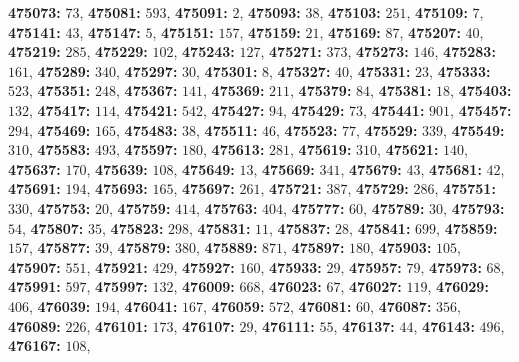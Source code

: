 \textsf{\bfseries 475073:} $73$, \textsf{\bfseries 475081:} $593$, \textsf{\bfseries 475091:} $2$, \textsf{\bfseries 475093:} $38$, \textsf{\bfseries 475103:} $251$, \textsf{\bfseries 475109:} $7$, \textsf{\bfseries 475141:} $43$, \textsf{\bfseries 475147:} $5$, \textsf{\bfseries 475151:} $157$, \textsf{\bfseries 475159:} $21$, \textsf{\bfseries 475169:} $87$, \textsf{\bfseries 475207:} $40$, \textsf{\bfseries 475219:} $285$, \textsf{\bfseries 475229:} $102$, \textsf{\bfseries 475243:} $127$, \textsf{\bfseries 475271:} $373$, \textsf{\bfseries 475273:} $146$, \textsf{\bfseries 475283:} $161$, \textsf{\bfseries 475289:} $340$, \textsf{\bfseries 475297:} $30$, \textsf{\bfseries 475301:} $8$, \textsf{\bfseries 475327:} $40$, \textsf{\bfseries 475331:} $23$, \textsf{\bfseries 475333:} $523$, \textsf{\bfseries 475351:} $248$, \textsf{\bfseries 475367:} $141$, \textsf{\bfseries 475369:} $211$, \textsf{\bfseries 475379:} $84$, \textsf{\bfseries 475381:} $18$, \textsf{\bfseries 475403:} $132$, \textsf{\bfseries 475417:} $114$, \textsf{\bfseries 475421:} $542$, \textsf{\bfseries 475427:} $94$, \textsf{\bfseries 475429:} $73$, \textsf{\bfseries 475441:} $901$, \textsf{\bfseries 475457:} $294$, \textsf{\bfseries 475469:} $165$, \textsf{\bfseries 475483:} $38$, \textsf{\bfseries 475511:} $46$, \textsf{\bfseries 475523:} $77$, \textsf{\bfseries 475529:} $339$, \textsf{\bfseries 475549:} $310$, \textsf{\bfseries 475583:} $493$, \textsf{\bfseries 475597:} $180$, \textsf{\bfseries 475613:} $281$, \textsf{\bfseries 475619:} $310$, \textsf{\bfseries 475621:} $140$, \textsf{\bfseries 475637:} $170$, \textsf{\bfseries 475639:} $108$, \textsf{\bfseries 475649:} $13$, \textsf{\bfseries 475669:} $341$, \textsf{\bfseries 475679:} $43$, \textsf{\bfseries 475681:} $42$, \textsf{\bfseries 475691:} $194$, \textsf{\bfseries 475693:} $165$, \textsf{\bfseries 475697:} $261$, \textsf{\bfseries 475721:} $387$, \textsf{\bfseries 475729:} $286$, \textsf{\bfseries 475751:} $330$, \textsf{\bfseries 475753:} $20$, \textsf{\bfseries 475759:} $414$, \textsf{\bfseries 475763:} $404$, \textsf{\bfseries 475777:} $60$, \textsf{\bfseries 475789:} $30$, \textsf{\bfseries 475793:} $54$, \textsf{\bfseries 475807:} $35$, \textsf{\bfseries 475823:} $298$, \textsf{\bfseries 475831:} $11$, \textsf{\bfseries 475837:} $28$, \textsf{\bfseries 475841:} $699$, \textsf{\bfseries 475859:} $157$, \textsf{\bfseries 475877:} $39$, \textsf{\bfseries 475879:} $380$, \textsf{\bfseries 475889:} $871$, \textsf{\bfseries 475897:} $180$, \textsf{\bfseries 475903:} $105$, \textsf{\bfseries 475907:} $551$, \textsf{\bfseries 475921:} $429$, \textsf{\bfseries 475927:} $160$, \textsf{\bfseries 475933:} $29$, \textsf{\bfseries 475957:} $79$, \textsf{\bfseries 475973:} $68$, \textsf{\bfseries 475991:} $597$, \textsf{\bfseries 475997:} $132$, \textsf{\bfseries 476009:} $668$, \textsf{\bfseries 476023:} $67$, \textsf{\bfseries 476027:} $119$, \textsf{\bfseries 476029:} $406$, \textsf{\bfseries 476039:} $194$, \textsf{\bfseries 476041:} $167$, \textsf{\bfseries 476059:} $572$, \textsf{\bfseries 476081:} $60$, \textsf{\bfseries 476087:} $356$, \textsf{\bfseries 476089:} $226$, \textsf{\bfseries 476101:} $173$, \textsf{\bfseries 476107:} $29$, \textsf{\bfseries 476111:} $55$, \textsf{\bfseries 476137:} $44$, \textsf{\bfseries 476143:} $496$, \textsf{\bfseries 476167:} $108$, 
